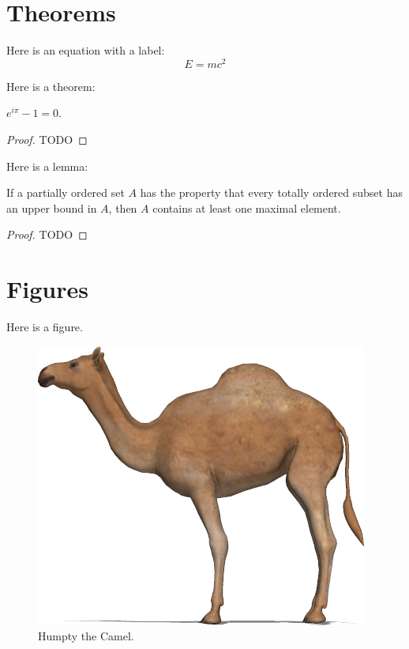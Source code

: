 \documentclass{camel}
\begin{document}
\makefrontmatter

\chapter{Theorems}\label{ch:theorems}

Here is an equation with a label:
\begin{equation}\label{eq:einstein}
E = mc^2
\end{equation}

Here is a theorem:
\begin{theorem}\label{thm:euler}
$e^{i\pi}-1=0$.
\end{theorem}
\begin{proof}
TODO
\end{proof}

Here is a lemma:
\begin{lemma}\label{lem:zorn}
If a partially ordered set $A$ has the property that every totally ordered subset has an upper bound in $A$, then $A$ contains at least one maximal element.
\end{lemma}
\begin{proof}
TODO
\end{proof}


\chapter{Figures}\label{ch:figures}

Here is a figure.
\begin{figure}[htb]
\centering
\includegraphics[scale=0.25]{figures/humpty.png}
\caption{Humpty the Camel.}
\label{humpty-the-camel}
\end{figure}
\end{document}

